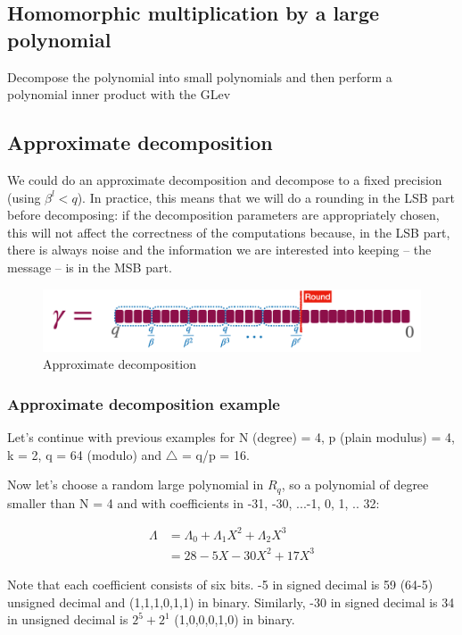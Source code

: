 \documentclass{techrep}
\theoremstyle{definition}
\theoremstyle{plain}
\begin{document}
\subsection{Homomorphic multiplication by a large polynomial}
Decompose the polynomial into small polynomials  and then perform a polynomial inner product with the GLev


\subsection{Approximate decomposition}

We could do an approximate decomposition and decompose to a fixed precision (using $\beta^l < q$). In practice, this means that we will do a rounding in the LSB part before decomposing: if the decomposition parameters are appropriately chosen, this will not affect the correctness of the computations because, in the LSB part, there is always noise and the information we are interested into keeping -- the message -- is in the MSB part. 

	\begin{figure}[H]
		\centering
	\includegraphics[width=.9\columnwidth]{fig/approx_decomp.png}
		\caption{Approximate decomposition}
		\label{fig:approx_decomp}
	\end{figure}

\subsubsection{Approximate decomposition example}
Let’s continue with previous examples for N (degree) = 4, p (plain modulus) = 4, k = 2, q = 64 (modulo) and $\bigtriangleup$ = q/p = 16.

Now let's choose a random large polynomial in $R_q$, so a polynomial of degree smaller than N = 4 and with coefficients in {-31, -30, ...-1, 0, 1, .. 32}:

	\begin{align*}
\Lambda	&=	 \Lambda_0 + \Lambda_1X^2 + \Lambda_2X^3 \\
                 &= 28 - 5X - 30X^2 + 17X^3 
	\end{align*}

Note that each coefficient consists of six bits.  -5 in signed decimal is 59 (64-5) unsigned decimal and (1,1,1,0,1,1) in binary. Similarly, -30 in signed decimal is 34 in unsigned decimal is $2^5 + 2^1$ (1,0,0,0,1,0) in binary.
\end{document}
